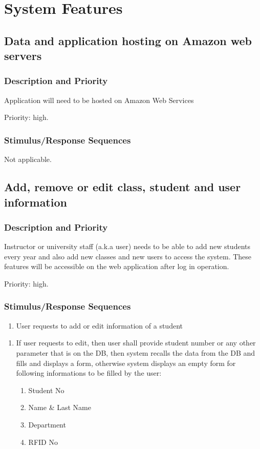 \documentclass{scrreprt}
\newcommand{\stimulus}[1] {
  \begin{enumerate}[leftmargin=5.7\parindent, label=Stimulus:]
  \item #1
  \end{enumerate}
  
  }
\newcommand{\response}[1] {
  \smallskip
  \begin{enumerate}[leftmargin=6\parindent, label=Response:]
  \item #1
  \end{enumerate}
  }
\begin{document}
{\let\clearpage\relax\chapter{System Features}}

\section{Data and application hosting on Amazon web servers}

\subsection{Description and Priority}
Application will need to be hosted on Amazon Web Services

\vspace{2mm}
Priority: high.

\subsection{Stimulus/Response Sequences}

Not applicable.

\section{Add, remove or edit class, student and user information}

\subsection{Description and Priority}
Instructor or university staff (a.k.a user) needs to be able to add new students every year and also add new classes and new users to access the system. These features will be accessible on the web application after log in operation.

\vspace{2mm}
Priority: high.

\subsection{Stimulus/Response Sequences}

\stimulus{User requests to add or edit information of a student}
\response{  If user requests to edit, then user shall provide student number or any other parameter that is on the DB, then system recalls the data from the DB and fills and displays a form, otherwise system displays an empty form for following informations to be filled by the user: 
\begin{enumerate}[leftmargin=10\parindent, label=\arabic*.]
  \item Student No
  \item Name \& Last Name 
  \item Department
  \item RFID No
\end{enumerate}
}
\end{document}

